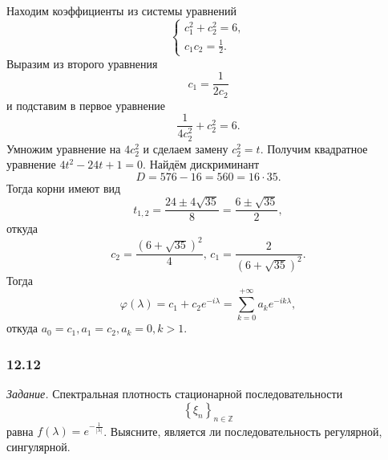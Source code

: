 Находим коэффициенты из системы уравнений
\begin{equation*}
  \begin{cases}
    c_1^2 + c_2^2 = 6, \\
    c_1 c_2 = \frac{1}{2}.
  \end{cases}
\end{equation*}
Выразим из второго уравнения
\begin{equation*}
  c_1 =
  \frac{1}{2c_2}
\end{equation*}
и подставим в первое уравнение
\begin{equation*}
  \frac{1}{4c_2^2} + c_2^2 = 6.
\end{equation*}
Умножим уравнение на $4c_2^2$ и сделаем замену $c_2^2 = t$.
Получим квадратное уравнение $4t^2 - 24t + 1 = 0$.
Найдём дискриминант
\begin{equation*}
  D =
  576 - 16 = 560 = 16 \cdot 35.
\end{equation*}
Тогда корни имеют вид
\begin{equation*}
  t_{1, 2} =
  \frac{24 \pm 4 \sqrt{35}}{8} =
  \frac{6 \pm \sqrt{35}}{2},
\end{equation*}
откуда
\begin{equation*}
  c_2 = \frac{ \left( 6 + \sqrt{35} \right)^2}{4}, \,
  c_1 = \frac{2}{ \left( 6 + \sqrt{35} \right)^2}.
\end{equation*}
Тогда
\begin{equation*}
  \varphi \left( \lambda \right) =
  c_1 + c_2 e^{-i \lambda } =
  \sum \limits_{k = 0}^{+\infty } a_k e^{-ik \lambda },
\end{equation*}
откуда $a_0 = c_1, a_1 = c_2, a_k = 0, k > 1$.

\subsubsection*{12.12}

\textit{Задание.}
Спектральная плотность стационарной последовательности
\begin{equation*}
  \left\{ \xi_n \right\}_{n \in \mathbb{Z}}
\end{equation*}
равна $f \left( \lambda \right) = e^{-\frac{1}{ \left| \lambda \right| }}$.
Выясните, является ли последовательность регулярной, сингулярной.

